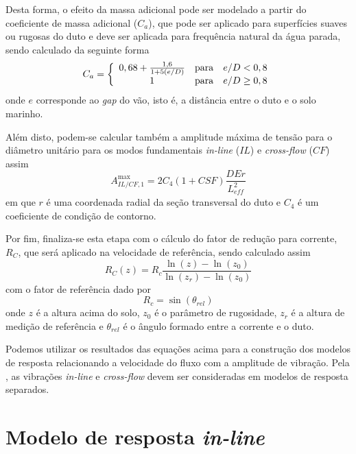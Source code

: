 Desta forma, o efeito da massa adicional pode ser modelado a partir do coeficiente de massa adicional ($C_a$), que pode ser aplicado para superfícies suaves ou rugosas do duto e deve ser aplicada para frequência natural da água parada, sendo calculado da seguinte forma
\begin{equation}
\label{eq:viv-Ca}
C_a = \left\{
\begin{array}{c c l}
	0,68 + \frac{1,6}{1 + 5 (e/D)} & \mathrm{para} & e/D < 0,8 \\
	1                              & \mathrm{para} & e/D \geq 0,8
\end{array}
\right.
\end{equation}
onde $e$ corresponde ao \textit{gap} do vão, isto é, a distância entre o duto e o solo marinho.

Além disto, podem-se calcular também a amplitude máxima de tensão para o diâmetro unitário para os modos fundamentais \textit{in-line} ($\mathit{IL}$) e \textit{cross-flow} ($\mathit{CF}$) assim
\begin{equation}
\label{eq:viv-Ailcf}
A_{\mathit{IL}/\mathit{CF}, 1}^\mathrm{max} = 2 C_4(1 + \mathit{CSF})\frac{D E r}{L_\mathit{eff}^2}
\end{equation}
em que $r$ é uma coordenada radial da seção transversal do duto e $C_4$ é um coeficiente de condição de contorno.


Por fim, finaliza-se esta etapa com o cálculo do fator de redução para corrente, $R_C$, que será aplicado na velocidade de referência, sendo calculado assim
\begin{equation}
\label{eq:viv-R_C}
R_C(z) = R_c \frac{\ln(z)-\ln(z_0)}{\ln(z_r)-\ln(z_0)}
\end{equation}
com o fator de referência dado por
\begin{equation}
\nonumber
R_c = \sin(\theta_\mathit{rel})
\end{equation}
onde $z$ é a altura acima do solo, $z_0$ é o parâmetro de rugosidade, $z_r$ é a altura de medição de referência e $\theta_\mathit{rel}$ é o ângulo formado entre a corrente e o duto.

Podemos utilizar os resultados das equações acima para a construção dos modelos de resposta relacionando a velocidade do fluxo com a amplitude de vibração.
Pela , as vibrações \textit{in-line} e \textit{cross-flow} devem ser consideradas em modelos de resposta separados.


\section{Modelo de resposta \textit{in-line}}
\label{sec:modelo-resposta-inline}

